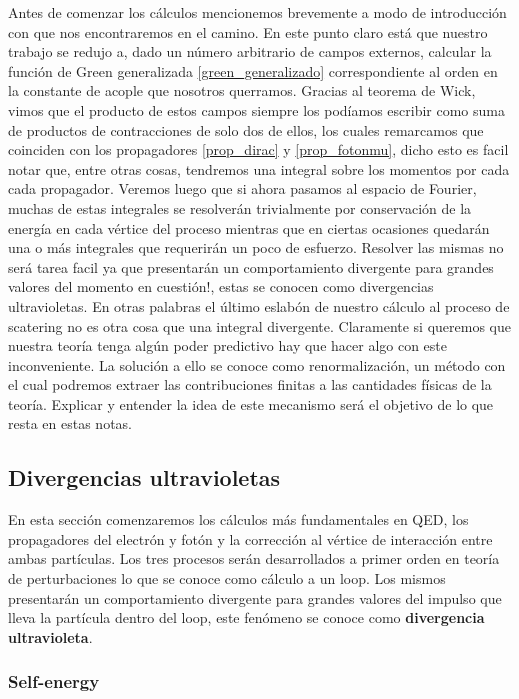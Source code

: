 \documentclass{article}
\numberwithin{equation}{section}
\begin{document}
Antes de comenzar los cálculos mencionemos brevemente a modo de introducción con que nos encontraremos en el camino. En este punto claro está que nuestro trabajo se redujo a, dado un número arbitrario de campos externos, calcular la función de Green generalizada \ref{green_generalizado} correspondiente al orden en la constante de acople que nosotros querramos. Gracias al teorema de Wick, vimos que el producto de estos campos siempre los podíamos escribir como suma de productos de contracciones de solo dos de ellos, los cuales remarcamos que coinciden con los propagadores \ref{prop_dirac} y \ref{prop_fotonmu}, dicho esto es facil notar que, entre otras cosas, tendremos una integral sobre los momentos por cada cada propagador. Veremos luego que si ahora pasamos al espacio de Fourier, muchas de estas integrales se resolverán trivialmente por conservación de la energía en cada vértice del proceso mientras que en ciertas ocasiones quedarán una o más integrales que requerirán un poco de esfuerzo. Resolver las mismas no será tarea facil ya que presentarán un comportamiento divergente para grandes valores del momento en cuestión!, estas se conocen como divergencias ultravioletas. En otras palabras el último eslabón de nuestro cálculo al proceso de scatering no es otra cosa que una integral divergente. Claramente si queremos que nuestra teoría tenga algún poder predictivo hay que hacer algo con este inconveniente. La solución a ello se conoce como renormalización, un método con el cual podremos extraer las contribuciones finitas a las cantidades físicas de la teoría. Explicar y entender la idea de este mecanismo será el objetivo de lo que resta en estas notas.

\subsection{Divergencias ultravioletas}

En esta sección comenzaremos los cálculos más fundamentales en QED, los propagadores del electrón y fotón y la corrección al vértice de interacción entre ambas partículas. Los tres procesos serán desarrollados a primer orden en teoría de perturbaciones lo que se conoce como cálculo a un loop. Los mismos presentarán un comportamiento divergente para grandes valores del impulso que lleva la partícula dentro del loop, este fenómeno se conoce como \textbf{divergencia ultravioleta}. 

\subsubsection{Self-energy}
\end{document}
